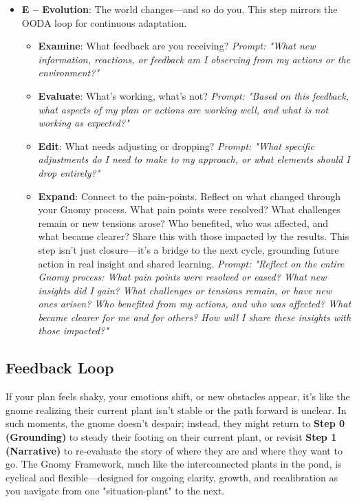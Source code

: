 \documentclass{article}
\begin{document}
\begin{itemize}[noitemsep,topsep=0pt]
    \item \textbf{E – Evolution}: The world changes—and so do you. This step mirrors the OODA loop for continuous adaptation.
    \begin{itemize}[noitemsep,topsep=0pt]
        \item \textbf{Examine}: What feedback are you receiving? \textit{Prompt: "What new information, reactions, or feedback am I observing from my actions or the environment?"}
        \item \textbf{Evaluate}: What's working, what's not? \textit{Prompt: "Based on this feedback, what aspects of my plan or actions are working well, and what is not working as expected?"}
        \item \textbf{Edit}: What needs adjusting or dropping? \textit{Prompt: "What specific adjustments do I need to make to my approach, or what elements should I drop entirely?"}
        \item \textbf{Expand}: Connect to the pain-points. Reflect on what changed through your Gnomy process. What pain points were resolved? What challenges remain or new tensions arose? Who benefited, who was affected, and what became clearer? Share this with those impacted by the results. This step isn't just closure—it's a bridge to the next cycle, grounding future action in real insight and shared learning. \textit{Prompt: "Reflect on the entire Gnomy process: What pain points were resolved or eased? What new insights did I gain? What challenges or tensions remain, or have new ones arisen? Who benefited from my actions, and who was affected? What became clearer for me and for others? How will I share these insights with those impacted?"}
    \end{itemize}
\end{itemize}

\subsection{Feedback Loop}
If your plan feels shaky, your emotions shift, or new obstacles appear, it's like the gnome realizing their current plant isn't stable or the path forward is unclear. In such moments, the gnome doesn't despair; instead, they might return to \textbf{Step 0 (Grounding)} to steady their footing on their current plant, or revisit \textbf{Step 1 (Narrative)} to re-evaluate the story of where they are and where they want to go. The Gnomy Framework, much like the interconnected plants in the pond, is cyclical and flexible—designed for ongoing clarity, growth, and recalibration as you navigate from one "situation-plant" to the next.
\end{document}
